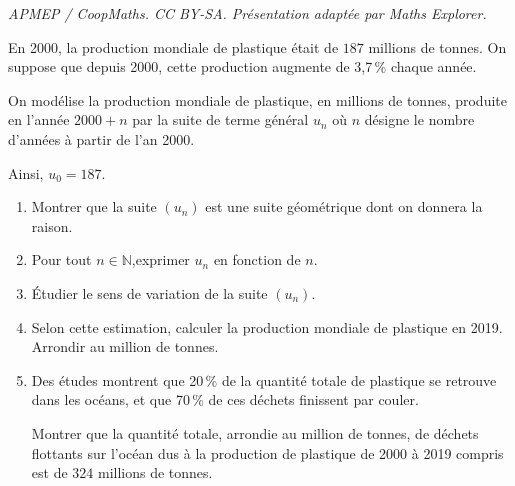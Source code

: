 \documentclass[10pt]{article}
\providecommand{\N}{\mathbb{N}}
\begin{document}
\noindent\textit{APMEP / CoopMaths. CC BY-SA. Présentation adaptée par Maths Explorer.}\par\medskip
\medskip

En 2000, la production mondiale de plastique était de $187$ millions de tonnes. On suppose que depuis 2000, cette production augmente de 3,7\,\% chaque année.

On modélise la production mondiale de plastique, en millions de tonnes, produite en l'année $2000 + n$ par la suite de terme général $u_n$ où $n$ désigne le nombre d'années à partir de l'an 2000. 

Ainsi, $u_0 = 187$.

\medskip

\begin{enumerate}
\item Montrer que la suite $\left(u_n\right)$ est une suite géométrique dont on donnera la raison.
\item Pour tout $n \in \N$,exprimer $u_n$ en fonction de $n$.
\item Étudier le sens de variation de la suite $\left(u_n\right)$.
\item  Selon cette estimation, calculer la production mondiale de plastique en 2019. Arrondir au million de tonnes.
\item Des études montrent que 20\,\% de la quantité totale de plastique se retrouve dans les océans, et que 70\,\% de ces déchets finissent par couler.

Montrer que la quantité totale, arrondie au million de tonnes, de déchets flottants sur l'océan dus à la production de plastique de 2000 à 2019 compris est de $324$ millions de tonnes.
\end{enumerate}

\bigskip
\end{document}
